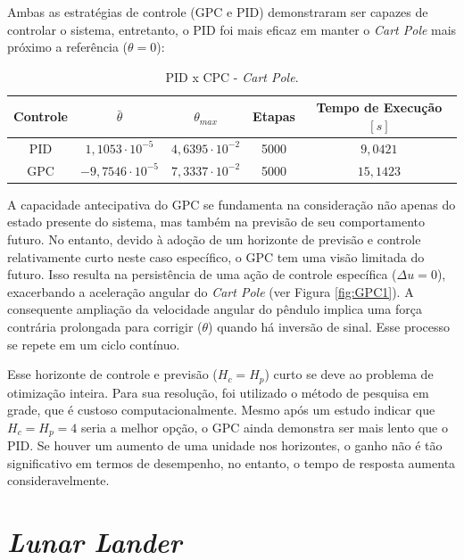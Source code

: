 \documentclass[12pt,           %
a4paper,                       %
openany,                       %
oneside,                       %
chapter=TITLE,                 %
english,                       %
spanish,                       %
brazil,                        %
sumario=tradicional]{abntex2}  %
\begin{document}
\begin{OnehalfSpace}
Ambas as estratégias de controle (GPC e PID) demonstraram ser capazes de controlar o sistema, entretanto, o PID foi mais eficaz em manter o \textit{Cart Pole} mais próximo a referência ($\theta=0$):

\begin{table}[H]
	\centering
	\vspace*{-.2cm}
	\caption{PID x CPC - \textit{Cart Pole}.}
	\begin{tabular}{|c|c|c|c|c|}
			\hline
             Controle & $\bar{\theta}$ & $\theta_{max}$ & Etapas & Tempo de Execução $[s]$\\
            \hline
            PID & $1,1053\cdot 10^{-5}$ & $4,6395\cdot 10^{-2}$ & 5000 & $9,0421$\\
            \hline
            GPC & $-9,7546\cdot 10^{-5}$ & $7,3337\cdot 10^{-2}$  & 5000 & $15,1423$\\ 
            \hline
	\end{tabular}  
    \label{tab:intcartpole}                 %
\end{table}
\vspace*{-0.7cm}
{\raggedright {}}

A capacidade antecipativa do GPC se fundamenta na consideração não apenas do estado presente do sistema, mas também na previsão de seu comportamento futuro. No entanto, devido à adoção de um horizonte de previsão e controle relativamente curto neste caso específico, o GPC tem uma visão limitada do futuro. Isso resulta na persistência de uma ação de controle específica ($\Delta u = 0$), exacerbando a aceleração angular do \textit{Cart Pole} (ver Figura \ref{fig:GPC1}). A consequente ampliação da velocidade angular do pêndulo implica uma força contrária prolongada para corrigir ($\theta$) quando há inversão de sinal. Esse processo se repete em um ciclo contínuo. 

Esse horizonte de controle e previsão ($H_c=H_p$) curto se deve ao problema de otimização inteira. Para sua resolução, foi utilizado o método de pesquisa em grade, que é custoso computacionalmente. Mesmo após um estudo indicar que $H_c=H_p=4$ seria a melhor opção, o GPC ainda demonstra ser mais lento que o PID. Se houver um aumento de uma unidade nos horizontes, o ganho não é tão significativo em termos de desempenho, no entanto, o tempo de resposta aumenta consideravelmente.
 
\section{\textit{Lunar Lander}}


\end{OnehalfSpace}
\end{document}
